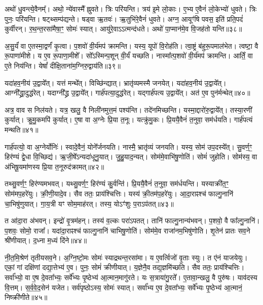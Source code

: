 अथो॑ धु॒वन्त्ये॒वैनम्᳚।
अथो॒ न्ये॑वास्मै᳚ ह्नुवते।
त्रिः परि॑यन्ति।
त्रय॑ इ॒मे लो॒काः।
ए॒भ्य ए॒वैनं॑ लो॒केभ्यो॑ धुवते।
त्रिः पुनः॒ परि॑यन्ति।
षट्थ्सम्प॑द्यन्ते।
षड्वा ऋ॒तवः॑।
ऋ॒तुभि॑रे॒वैनं॑ धुवते।
अग्न॒ आयूꣳ॑षि पवस॒ इति॑ प्रति॒पदं॑ कुर्वीरन्।
र॒थ॒न्त॒रसा॑मैषा॒ꣳ॒ सोमः॑ स्यात्।
आयु॑रे॒वाऽऽत्मन्द॑धते।
अथो॑ पा॒प्मान॑मे॒व वि॒जह॑तो यन्ति॥३८॥\ip\anuvakamend[अ॒भिजि॑त्यै पृथि॒व्याश्च॒ स्याद॑ध्व॒र्युर्ब्रू॑याल्लो॒कयोः॒ परि॑ददति कुर्वीर॒ꣴ॒स्त्रीणि॑ च]

अ॒सु॒र्यं॑ वा ए॒तस्मा॒द्वर्णं॑ कृ॒त्वा।
प॒शवो॑ वी॒र्य॑मप॑ क्रामन्ति।
यस्य॒ यूपो॑ वि॒रोह॑ति।
त्वा॒ष्ट्रं ब॑हुरू॒पमाल॑भेत।
त्वष्टा॒ वै रू॒पाणा॑मीशे।
य ए॒व रू॒पाणा॒मीशे᳚।
सो᳚ऽस्मिन्प॒शून् वी॒र्यं॑ यच्छति।
नास्मा᳚त्प॒शवो॑ वी॒र्य॑मप॑ क्रामन्ति।
आर्तिं॒ वा ए॒ते निय॑न्ति।
येषां᳚ दीक्षि॒ताना॑म॒ग्निरु॒द्वाय॑ति॥३९॥\ip

यदा॑हव॒नीय॑ उ॒द्वाये᳚त्।
यत्तं मन्थे᳚त्।
वि\-च्छि॑न्द्यात्।
भ्रातृ॑व्यमस्मै जनयेत्।
यदा॑हव॒नीय॑ उ॒द्वाये᳚त्।
आग्नी᳚द्ध्रा॒दुद्ध॑\-रेत्।
यदाग्नी᳚द्ध्र उ॒द्वाये᳚त्।
गार्\mbox{}ह॑पत्या॒दुद्ध॑रेत्।
यद्गार्\mbox{}ह॑पत्य उ॒द्वाये᳚त्।
अत॑ ए॒व पुन॑र्मन्थेत्॥४०॥\ip

अत्र॒ वाव स निल॑यते।
यत्र॒ खलु॒ वै निली॑नमुत्त॒मं पश्य॑न्ति।
तदे॑नमिच्छन्ति।
यस्मा॒द्दारो॑रु॒द्वाये᳚त्।
तस्या॒रणी॑ कुर्यात्।
क्रु॒मु॒कमपि॑ कुर्यात्।
ए॒षा वा अ॒ग्नेः प्रि॒या त॒नूः।
यत्क्रु॑मु॒कः।
प्रि॒ययै॒वैनं॑ त॒नुवा॒ सम॑र्धयति।
गार्\mbox{}ह॑पत्यं मन्थति॥४१॥\ip

गार्\mbox{}ह॑पत्यो॒ वा अ॒ग्नेर्योनिः॑।
स्वादे॒वैनं॒ योने᳚र्जनयति।
नास्मै॒ भ्रातृ॑व्यं जनयति।
यस्य॒ सोम॑ उप॒दस्ये᳚त्।
सु॒वर्ण॒ꣳ॒ हिर॑ण्यं द्वे॒धा वि॒च्छिद्य॑।
ऋ॒जी॒षे᳚\-ऽन्यदा॑धूनु॒यात्।
जु॒हु॒याद॒न्यत्।
सोम॑मे॒वाभि॑षु॒णोति॑।
सोमं॑ जुहोति।
सोम॑स्य॒ वा अ॑भिषू॒यमा॑णस्य प्रि॒या त॒नूरुद॑क्रामत्॥४२॥\ip

तथ्सु॒वर्ण॒ꣳ॒ हिर॑ण्यमभवत्।
यथ्सु॒वर्ण॒ꣳ॒ हिर॑ण्यं कु॒र्वन्ति॑।
प्रि॒ययै॒वैनं॑ त॒नुवा॒ सम॑र्धयन्ति।
यस्याक्री॑त॒ꣳ॒ सोम॑मप॒हरे॑युः।
क्री॒णी॒यादे॒व।
सैव ततः॒ प्राय॑श्चित्तिः।
यस्य॑ क्री॒तम॑प॒हरे॑युः।
आ॒दा॒राꣴश्च॑ फाल्गु॒नानि॑ चा॒भिषु॑णुयात्।
गा॒य॒त्री यꣳ सोम॒माह॑रत्।
तस्य॒ योऽꣳ॑शुः प॒रा\-ऽप॑तत्॥४३॥\ip

त आ॑दा॒रा अ॑भवन्।
इन्द्रो॑ वृ॒त्रम॑हन्।
तस्य॑ व॒ल्कः परा॑\-ऽपतत्।
तानि॑ फाल्गु॒नान्य॑भवन्।
प॒शवो॒ वै फा᳚ल्गु॒नानि॑।
प॒शवः॒ सोमो॒ राजा᳚।
यदा॑दा॒राꣴश्च॑ फाल्गु॒नानि॑ चाभिषु॒णोति॑।
सोम॑मे॒व राजा॑नम॒भिषु॑णोति।
शृ॒तेन॑ प्रातः सव॒ने श्री॑णीयात्।
द॒ध्ना म॒ध्यं दि॑ने॥४४॥\ip

नी॒त॒मि॒श्रेण॑ तृतीयसव॒ने।
अ॒ग्नि॒ष्टो॒मः सोमः॑ स्याद्रथन्त॒र\-सा॑मा।
य ए॒वर्त्विजो॑ वृ॒ताः स्युः।
त ए॑नं याजयेयुः।
एकां॒ गां दक्षि॑णां दद्या॒त्तेभ्य॑ ए॒व।
पुनः॒ सोमं॑ क्रीणीयात्।
य॒ज्ञेनै॒व तद्य॒ज्ञमि॑च्छति।
सैव ततः॒ प्राय॑श्चित्तिः।
सर्वा᳚भ्यो॒ वा ए॒ष दे॒वता᳚भ्यः॒ सर्वे᳚भ्यः पृ॒ष्ठेभ्य॑ आ॒त्मान॒मागु॑रते।
यः स॒त्राया॑गु॒रते᳚।
ए॒तावा॒न्खलु॒ वै पुरु॑षः।
याव॑दस्य वि॒त्तम्।
स॒र्व॒वे॒द॒सेन॑ यजेत।
सर्व॑पृष्ठो\-ऽस्य॒ सोमः॑ स्यात्।
सर्वा᳚भ्य ए॒व दे॒वता᳚भ्यः॒ सर्वे᳚भ्यः पृ॒ष्ठेभ्य॑ आ॒त्मानं॒ निष्क्री॑णीते॥४५॥\ip\anuvakamend[उ॒द्वाय॑ति मन्थेन्मन्थत्यक्रामत्प॒रा\-ऽप॑तन्म॒ध्यन्दि॑न आगु॒रते॒ पञ्च॑ च]

